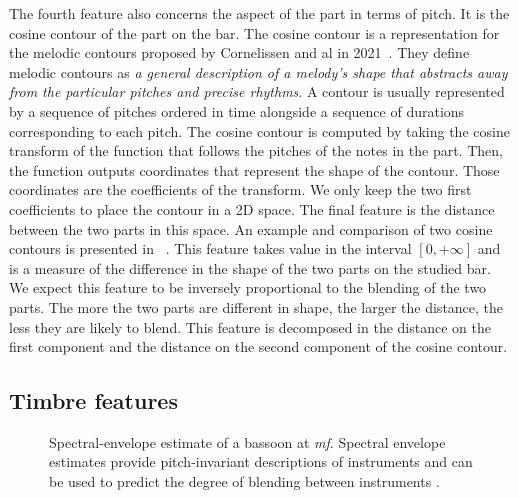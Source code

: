 \documentclass{article}
\newcommand{\fm}[1]{\textcolor{magenta}{FM: << #1 >>}}
\begin{document}
The fourth feature also concerns the aspect of the part in terms of pitch. It is the cosine contour of the part on the bar. 
The cosine contour is a representation for the melodic contours proposed by Cornelissen and al in 2021~\cite{cornelissen_cosine_2021}.
They define melodic contours as \textit{a general description of a melody's shape that abstracts away from the particular pitches and precise rhythms}.
A contour is usually represented by a sequence of pitches ordered in time alongside a sequence of durations corresponding to each pitch.
The cosine contour is computed by taking the cosine transform of the function that follows the pitches of the notes in the part.
Then, the function outputs coordinates that represent the shape of the contour. Those coordinates are the coefficients of the transform. 
We only keep the two first coefficients to place the contour in a 2D space. The final feature is the distance between the two parts in this space.
An example and comparison of two cosine contours is presented in ~.
This feature takes value in the interval $[0, +\infty]$ and is a measure of the difference in the shape of the two parts on the studied bar.
We expect this feature to be inversely proportional to the blending of the two parts.
The more the two parts are different in shape, the larger the distance, the less they are likely to blend.
This feature is decomposed in the distance on the first component and the distance on the second component of the cosine contour.


\subsection{Timbre features}


\begin{figure}[ht]
  \centerline{}
  \caption{Spectral-envelope estimate of a bassoon at \textit{mf}.
  Spectral envelope estimates provide pitch-invariant descriptions of instruments and can be used to predict the degree of blending between instruments
  \cite{spectral_envelope_Lembke}.}
  \label{fig:spectral}
\end{figure}
\end{document}
